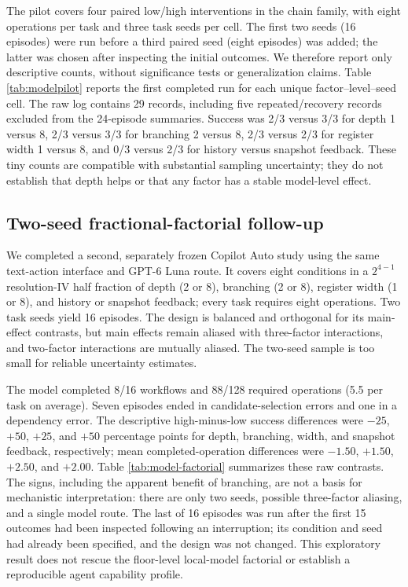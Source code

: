 \documentclass[sigconf,nonacm]{acmart}
\begin{document}
The pilot covers four paired low/high interventions in the chain family,
with eight operations per task and three task seeds per cell. The first two
seeds (16 episodes) were run before a third paired seed (eight episodes)
was added; the latter was chosen after inspecting the initial outcomes. We
therefore report only descriptive counts, without significance tests or
generalization claims. Table \ref{tab:modelpilot} reports the first
completed run for each unique factor--level--seed cell. The raw log contains
29 records, including five repeated/recovery records excluded from the
24-episode summaries. Success was 2/3 versus
3/3 for depth 1 versus 8, 2/3 versus 3/3 for branching 2 versus 8, 2/3
versus 2/3 for register width 1 versus 8, and 0/3 versus 2/3 for history
versus snapshot feedback. These tiny counts are compatible with substantial
sampling uncertainty; they do not establish that depth helps or that any
factor has a stable model-level effect.

\begin{table}[t]
\centering\small

\caption{Exploratory Copilot-routed GPT-6 Luna pilot. Mean completed
operations are out of eight. Each cell has three task seeds; no inferential
claims are warranted.}
\label{tab:modelpilot}
\end{table}

\subsection{Two-seed fractional-factorial follow-up}
We completed a second, separately frozen Copilot Auto study using the same
text-action interface and GPT-6 Luna route. It covers eight conditions in a
$2^{4-1}$ resolution-IV half fraction of depth (2 or 8), branching (2 or
8), register width (1 or 8), and history or snapshot feedback; every task
requires eight operations. Two task seeds yield 16 episodes. The design is
balanced and orthogonal for its main-effect contrasts, but main effects
remain aliased with three-factor interactions, and two-factor interactions
are mutually aliased. The two-seed sample is too small for reliable
uncertainty estimates.

The model completed 8/16 workflows and 88/128 required operations (5.5 per
task on average). Seven episodes ended in candidate-selection errors and
one in a dependency error. The descriptive high-minus-low success
differences were $-25$, $+50$, $+25$, and $+50$ percentage points for
depth, branching, width, and snapshot feedback, respectively; mean
completed-operation differences were $-1.50$, $+1.50$, $+2.50$, and
$+2.00$. Table \ref{tab:model-factorial} summarizes these raw contrasts.
The signs, including the apparent benefit of branching, are not a basis for
mechanistic interpretation: there are only two seeds, possible
three-factor aliasing, and a single model route. The last of 16 episodes
was run after the first 15 outcomes had been inspected following an
interruption; its condition and seed had already been specified, and the
design was not changed. This exploratory result does not rescue the
floor-level local-model factorial or establish a reproducible agent
capability profile.
\end{document}
